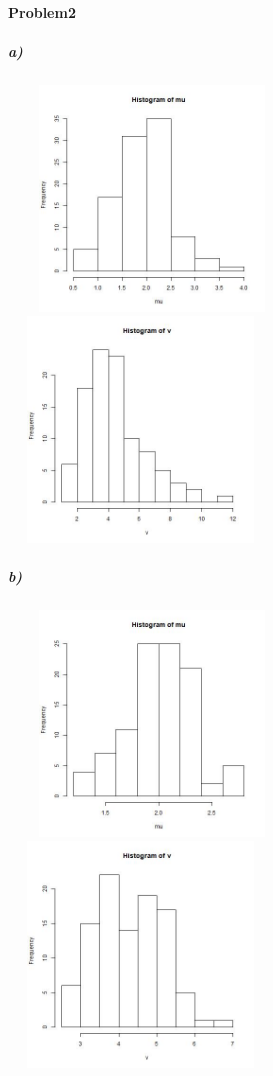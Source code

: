 \documentclass{article}
\begin{document}
\paragraph{Problem2}
\subparagraph{a)}~{}
\newline
\includegraphics[height=6cm,width=7cm]{2amean.jpg}
\includegraphics[height=6cm,width=7cm]{2avar.jpg}
\subparagraph{b)}~{}
\newline
\includegraphics[height=6cm,width=7cm]{2bmean.jpg}
\includegraphics[height=6cm,width=7cm]{2bvar.jpg}
\end{document}

